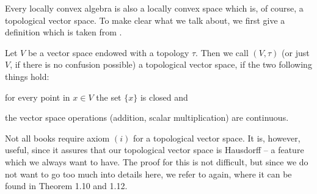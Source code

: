 Every locally convex algebra is also a locally convex space which 
is, of course, a topological vector space. To make clear what we talk about, 
we first give a definition which is taken from 
\cite[Definition 1.6]{rudin:1991a}.
\begin{definition}
	\label{Def:TVSpace}
	Let $V$ be a vector space endowed with a topology $\tau$. Then we call 
	$(V, \tau)$ (or just $V$, if there is no confusion possible) 
	a topological vector space, if the two following things  hold:
	\begin{definitionlist}
		\item
		for every point in $x \in V$ the set $\{x\} $ is closed and
		
		\item
		the vector space operations (addition, scalar multiplication) are 
		continuous.
	\end{definitionlist}
\end{definition}
Not all books require axiom $(i)$ for a topological vector space. It is, 
however, useful, since it assures that our topological vector 
space is Hausdorff -- a feature which we always want to have. The proof 
for this is not difficult, but since we do not want to go too much into details 
here, we refer to \cite{rudin:1991a} again, where it can be found in 
Theorem 1.10 and 1.12.


